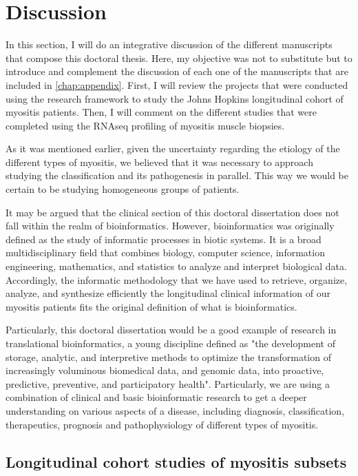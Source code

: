 \chapter{Discussion}

In this section, I will do an integrative discussion of the different manuscripts that compose this doctoral thesis. Here, my objective was not to substitute but to introduce and complement the discussion of each one of the manuscripts that are included in \autoref{chap:appendix}. First, I will review the projects that were conducted using the research framework to study the Johns Hopkins longitudinal cohort of myositis patients. Then, I will comment on the different studies that were completed using the RNAseq profiling of myositis muscle biopsies.

As it was mentioned earlier, given the uncertainty regarding the etiology of the different types of myositis, we believed that it was necessary to approach studying the classification and its pathogenesis in parallel. This way we would be certain to be studying homogeneous groups of patients.

It may be argued that the clinical section of this doctoral dissertation does not fall within the realm of bioinformatics. However, bioinformatics was originally defined as the study of informatic processes in biotic systems.\cite{Hogeweg1978} It is a broad multidisciplinary field that combines biology, computer science, information engineering, mathematics, and statistics to analyze and interpret biological data. Accordingly, the informatic methodology that we have used to retrieve, organize, analyze, and synthesize efficiently the longitudinal clinical information of our myositis patients fits the original definition of what is bioinformatics.

Particularly, this doctoral dissertation would be a good example of research in translational bioinformatics, a young discipline defined as "the development of storage, analytic, and interpretive methods to optimize the transformation of increasingly voluminous biomedical data, and genomic data, into proactive, predictive, preventive, and participatory health".\cite{Tenenbaum2016} Particularly, we are using a combination of clinical and basic bioinformatic research to get a deeper understanding on various aspects of a disease, including diagnosis, classification, therapeutics, prognosis and pathophysiology of different types of myositis.

\section{Longitudinal cohort studies of myositis subsets}

